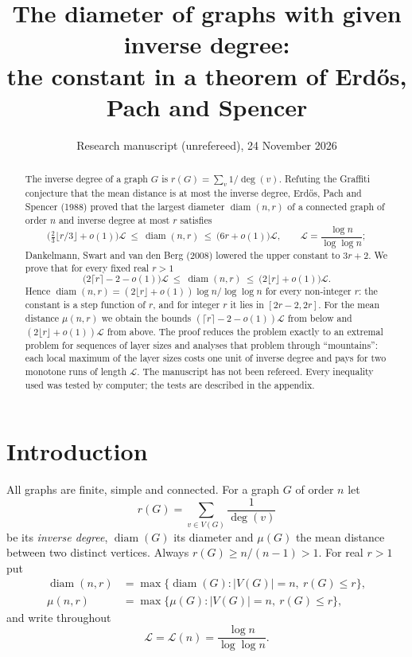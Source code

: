 \documentclass[11pt]{amsart}
\title[Diameter and inverse degree]{The diameter of graphs with given inverse degree:\\ the constant in a theorem of Erd\H{o}s, Pach and Spencer}
\author{Research manuscript (unrefereed), 24 November 2026}
\theoremstyle{definition}
\theoremstyle{remark}
\newcommand{\diam}{\operatorname{diam}}
\newcommand{\Lz}{\mathcal{L}}
\begin{document}
\begin{abstract}
The inverse degree of a graph $G$ is $r(G)=\sum_{v}1/\deg(v)$.
Refuting the Graffiti conjecture that the mean distance is at most the inverse degree, Erd\H{o}s, Pach and Spencer (1988) proved that the largest diameter $\diam(n,r)$ of a connected graph of order $n$ and inverse degree at most $r$ satisfies
\[
\bigl(\tfrac23\lfloor r/3\rfloor+o(1)\bigr)\Lz\ \le\ \diam(n,r)\ \le\ \bigl(6r+o(1)\bigr)\Lz,\qquad \Lz=\frac{\log n}{\log\log n};
\]
Dankelmann, Swart and van den Berg (2008) lowered the upper constant to $3r+2$.
We prove that for every fixed real $r>1$
\[
\bigl(2\lceil r\rceil-2-o(1)\bigr)\Lz\ \le\ \diam(n,r)\ \le\ \bigl(2\lfloor r\rfloor+o(1)\bigr)\Lz .
\]
Hence $\diam(n,r)=(2\lfloor r\rfloor+o(1))\log n/\log\log n$ for every non-integer $r$: the constant is a step function of $r$, and for integer $r$ it lies in $[2r-2,2r]$.
For the mean distance $\mu(n,r)$ we obtain the bounds $(\lceil r\rceil-2-o(1))\Lz$ from below and $(2\lfloor r\rfloor+o(1))\Lz$ from above.
The proof reduces the problem exactly to an extremal problem for sequences of layer sizes and analyses that problem through ``mountains'': each local maximum of the layer sizes costs one unit of inverse degree and pays for two monotone runs of length $\Lz$.
The manuscript has not been refereed. Every inequality used was tested by computer; the tests are described in the appendix.
\end{abstract}

\maketitle

\section{Introduction}

All graphs are finite, simple and connected. For a graph $G$ of order $n$ let
\[
r(G)=\sum_{v\in V(G)}\frac1{\deg(v)}
\]
be its \emph{inverse degree}, $\diam(G)$ its diameter and $\mu(G)$ the mean distance between two distinct vertices. Always $r(G)\ge n/(n-1)>1$.
For real $r>1$ put
\begin{align*}
\diam(n,r)&=\max\{\diam(G): |V(G)|=n,\ r(G)\le r\},\\
\mu(n,r)&=\max\{\mu(G): |V(G)|=n,\ r(G)\le r\},
\end{align*}
and write throughout
\[
\Lz=\Lz(n)=\frac{\log n}{\log\log n}.
\]
\end{document}
